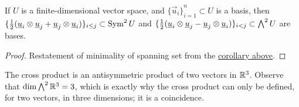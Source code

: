 \begin{corollary}
    If \(U\) is a finite-dimensional vector space,
    and \({\{\vec{u}_i\}}_{i=1}^n \subset U\) is a basis,
    then \(\{\frac{1}{2}(\underline{u}_i\otimes\underline{u}_j+\underline{u}_j\otimes\underline{u}_i)\}_{i \leq j} \subset \operatorname{Sym}^2 U\)
    and \(\{\frac{1}{2}(\underline{u}_i\otimes\underline{u}_j-\underline{u}_j\otimes\underline{u}_i)\}_{i<j} \subset \operatorname{{\bigwedge}}^2 U\)
    are bases.
\end{corollary}
\begin{proof}
    Restatement of minimality of spanning set from the
    \hyperref[cor:dim-sym-wedge]{corollary above}.
\end{proof}
\begin{remark}
    The cross product is an antisymmetric product of two vectors in \(\mathbb{R}^3\).
    Observe that \(\dim \operatorname{{\bigwedge}}^2 \mathbb{R}^3 = 3\),
    which is exactly why the cross product can only be defined,
    for two vectors, in three dimensions;
    it is a coincidence.
\end{remark}

